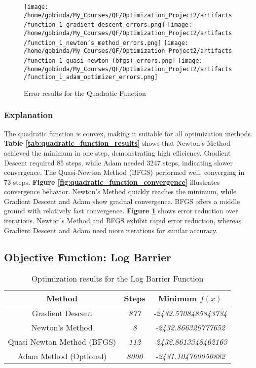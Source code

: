 \documentclass[12pt]{article}
\begin{document}
\begin{figure}[htbp]
   \centering
   \texttt{[image: /home/gobinda/My\_Courses/QF/Optimization\_Project2/artifacts/function\_1\_gradient\_descent\_errors.png]}
   \texttt{[image: /home/gobinda/My\_Courses/QF/Optimization\_Project2/artifacts/function\_1\_newton's\_method\_errors.png]}
   \texttt{[image: /home/gobinda/My\_Courses/QF/Optimization\_Project2/artifacts/function\_1\_quasi-newton\_(bfgs)\_errors.png]}
   \texttt{[image: /home/gobinda/My\_Courses/QF/Optimization\_Project2/artifacts/function\_1\_adam\_optimizer\_errors.png]}
   \caption{\small Error results for the Quadratic Function}
   \label{fig:quadratic_function_errors}
\end{figure}

\subsubsection*{Explanation}
The quadratic function is convex, making it suitable for all optimization methods. \textbf{Table \ref{tab:quadratic_function_results}} shows that Newton's Method achieved the minimum in one step, demonstrating high efficiency. Gradient Descent required 85 steps, while Adam needed 3247 steps, indicating slower convergence. The Quasi-Newton Method (BFGS) performed well, converging in 73 steps.
\textbf{Figure \ref{fig:quadratic_function_convergence}} illustrates convergence behavior. Newton's Method quickly reaches the minimum, while Gradient Descent and Adam show gradual convergence. BFGS offers a middle ground with relatively fast convergence.
\textbf{Figure \ref{fig:quadratic_function_errors}} shows error reduction over iterations. Newton's Method and BFGS exhibit rapid error reduction, whereas Gradient Descent and Adam need more iterations for similar accuracy.

\subsection*{Objective Function: Log Barrier}

\begin{table}[htbp]
   \centering
   \small %
   \begin{tabular}{|c|c|c|}
      \hline
      \textbf{Method} & \textbf{Steps} & \textbf{Minimum \( f(x) \)} \\
      \hline
      Gradient Descent & \textit{877} & \textit{-2432.5708485843734} \\
      \hline
      Newton's Method & \textit{8} & \textit{-2432.866326777652} \\
      \hline
      Quasi-Newton Method (BFGS) & \textit{112} & \textit{-2432.8613348462163} \\
      \hline
      Adam Method (Optional) & \textit{8000} & \textit{-2431.104760050882} \\
      \hline
   \end{tabular}
   \caption{\small Optimization results for the Log Barrier Function}
   \label{tab:log_barrier_function_results}
\end{table}
\end{document}
